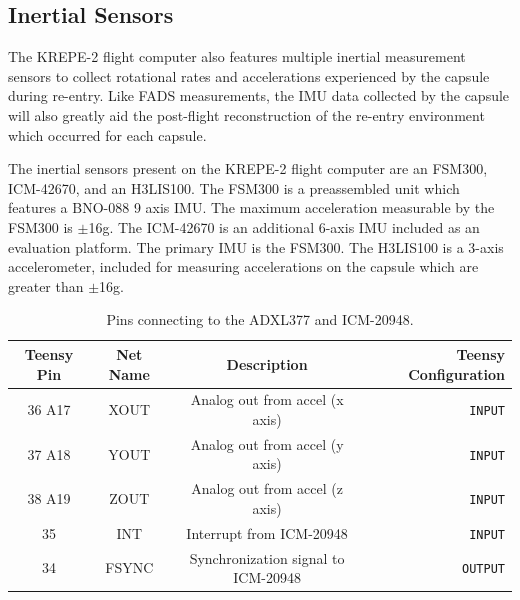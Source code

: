 \documentclass{article}
\begin{document}
\subsection{Inertial Sensors}
The KREPE-2 flight computer also features multiple inertial measurement sensors to collect rotational rates and accelerations experienced by the capsule during re-entry. Like FADS measurements, the IMU data collected by the capsule will also greatly aid the post-flight reconstruction of the re-entry environment which occurred for each capsule.

The inertial sensors present on the KREPE-2 flight computer are an FSM300, ICM-42670, and an H3LIS100. The FSM300 is a preassembled unit which features a BNO-088 9 axis IMU. The maximum acceleration measurable by the FSM300 is $\pm$16g. The ICM-42670 is an additional 6-axis IMU included as an evaluation platform. The primary IMU is the FSM300. The H3LIS100 is a 3-axis accelerometer, included for measuring accelerations on the capsule which are greater than $\pm$16g.

\begin{table}[H]
    \centering
    \caption{Pins connecting to the ADXL377 and ICM-20948.}
    \label{tab:pins_motionsensor}
    \begin{tabular}{c|c|c|r}
    Teensy Pin & Net Name  & Description   & Teensy Configuration \\
    \hline 
    36 A17 & XOUT & Analog out from accel (x axis) & \texttt{INPUT} \\
    37 A18 & YOUT & Analog out from accel (y axis) & \texttt{INPUT} \\
    38 A19 & ZOUT & Analog out from accel (z axis) & \texttt{INPUT} \\
    35 & INT & Interrupt from ICM-20948 & \texttt{INPUT} \\
    34 & FSYNC & Synchronization signal to ICM-20948 & \texttt{OUTPUT} 
    \end{tabular}
\end{table}

\end{document}

